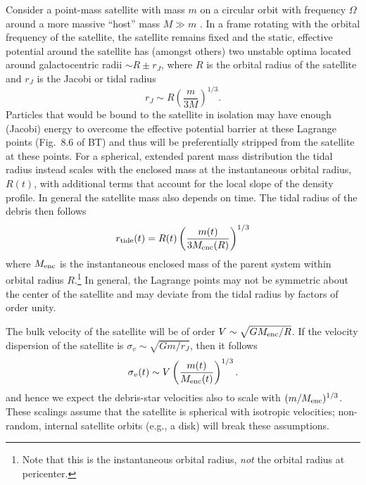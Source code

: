 \documentclass{emulateapj}
\begin{document}
Consider a point-mass satellite with mass $m$ on a circular orbit with frequency $\Omega$ around a more massive ``host'' mass $M\gg m$ \citep[the ``restricted three-body problem''; e.g., \S 8.3][]{binneytremaine}. In a frame rotating with the orbital frequency of the satellite, the satellite remains fixed and the static, effective potential around the satellite has (amongst others) two unstable optima located around galactocentric radii $\sim R \pm r_J$, where $R$ is the orbital radius of the satellite and $r_J$ is the Jacobi or tidal radius
\begin{equation}
	r_J \sim R\left(\frac{m}{3M}\right)^{1/3}.\label{eq:ptmass}
\end{equation}
Particles that would be bound to the satellite in isolation may have enough (Jacobi) energy to overcome the effective potential barrier at these Lagrange points (Fig.~8.6 of BT) and thus will be preferentially stripped from the satellite at these points. For a spherical, extended parent mass distribution the tidal radius instead scales with the enclosed mass at the instantaneous orbital radius, $R(t)$, with additional terms that account for the local slope of the density profile. In general the satellite mass also depends on time. The tidal radius of the debris then follows
\begin{equation}
	r_{\rm tide}(t) = R(t)\left(\frac{m(t)}{3M_{\rm enc}(R)}\right)^{1/3}\label{eq:tidalradius}
\end{equation}
where $M_{\rm enc}$ is the instantaneous enclosed mass of the parent system within orbital radius $R$.\footnote{Note that this is the instantaneous orbital radius, \emph{not} the orbital radius at pericenter.}
In general, the Lagrange points may not be symmetric about the center of the satellite and may deviate from the tidal radius by factors of order unity. 

The bulk velocity of the satellite will be of order $V\sim \sqrt{GM_{\rm enc}/R}$. If the velocity dispersion of the satellite is $\sigma_v \sim \sqrt{Gm/r_J}$, then it follows
\begin{equation}
	\sigma_v(t) \sim V\left(\frac{m(t)}{M_{\rm enc}(t)}\right)^{1/3}\label{eq:velscale}.
\end{equation}
\citep[as pointed out in][]{binneytremaine} and hence we expect the debris-star velocities also to scale with $(m/M_{\rm enc})^{1/3}$. These scalings assume that the satellite is spherical with isotropic velocities; non-random, internal satellite orbits (e.g., a disk) will break these assumptions. 
\end{document}
